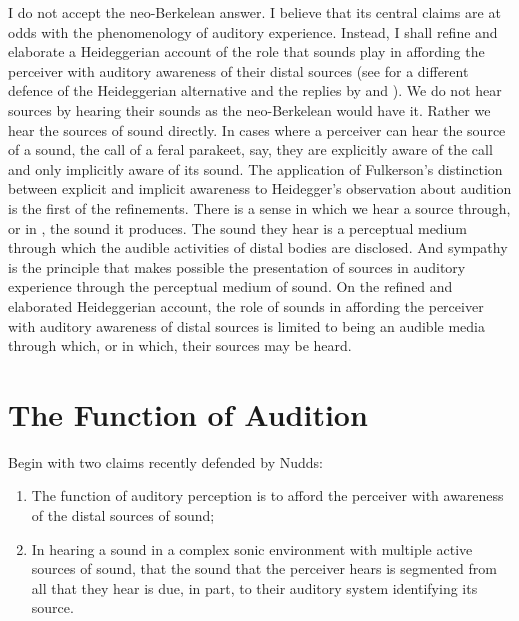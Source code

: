 I do not accept the neo-Berkelean answer. I believe that its central claims are at odds with the phenomenology of auditory experience. Instead, I shall refine and elaborate a Heideggerian account of the role that sounds play in affording the perceiver with auditory awareness of their distal sources (see \citealt{Leddington:2014aa} for a different defence of the Heideggerian alternative and the replies by \citealt{OCallaghan:2014aa} and \citealt{Nudds:2014aa}). We do not hear sources by hearing their sounds as the neo-Berkelean would have it. Rather we hear the sources of sound directly. In cases where a perceiver can hear the source of a sound, the call of a feral parakeet, say, they are explicitly aware of the call and only implicitly aware of its sound. The application of Fulkerson's \citeyearpar{Fulkerson:2014ek} distinction between explicit and implicit awareness to Heidegger's \citeyearpar{Heidegger:1935uq} observation about audition is the first of the refinements. There is a sense in which we hear a source through, or in \citep{Leddington:2014aa}, the sound it produces. The sound they hear is a perceptual medium through which the audible activities of distal bodies are disclosed. And sympathy is the principle that makes possible the presentation of sources in auditory experience through the perceptual medium of sound. On the refined and elaborated Heideggerian account, the role of sounds in affording the perceiver with auditory awareness of distal sources is limited to being an audible media through which, or in which, their sources may be heard.


\section{The Function of Audition} %
\label{sec:the_function_of_audition}


Begin with two claims recently defended by Nudds:
\begin{enumerate}[(1)]
	\item The function of auditory perception is to afford the perceiver with awareness of the distal sources of sound;
	\item In hearing a sound in a complex sonic environment with multiple active sources of sound, that the sound that the perceiver hears is segmented from all that they hear is due, in part, to their auditory system identifying its source.
\end{enumerate}

